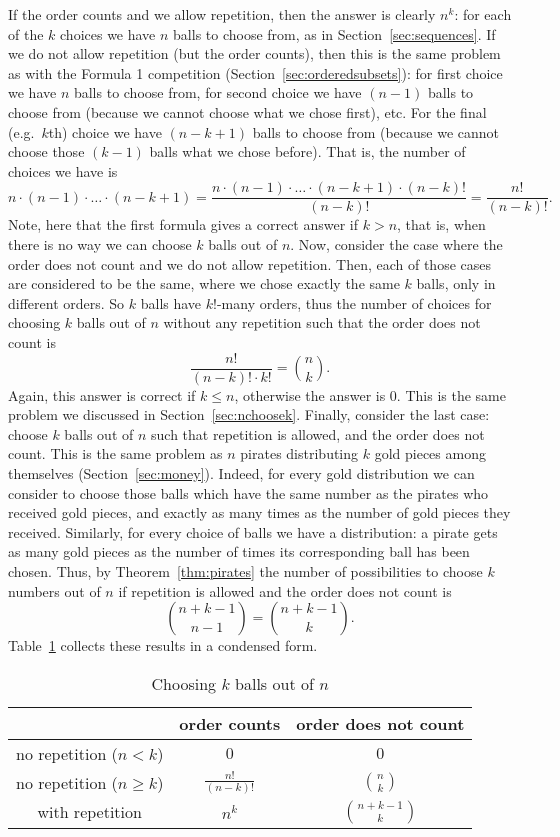 If the order counts and we allow repetition, 
then the answer is clearly $n^k$: 
for each of the $k$ choices we have $n$ balls to choose from, 
as in Section~\ref{sec:sequences}. 
If we do not allow repetition (but the order counts), 
then this is the same problem as with the Formula 1 competition (Section~\ref{sec:orderedsubsets}): 
for first choice we have $n$ balls to choose from, 
for second choice we have $(n-1)$ balls to choose from (because we cannot choose what we chose first), 
etc. 
For the final (e.g.\ $k$th) choice we have $(n-k+1)$ balls to choose from (because we cannot choose those $(k-1)$ balls what we chose before). 
That is, the number of choices we have is 
\[
n \cdot (n-1) \cdot \dots \cdot (n-k+1) = \frac{n \cdot (n-1) \cdot \dots \cdot (n-k+1) \cdot (n-k)!}{(n-k)!} = \frac{n!}{(n-k)!}. 
\]
Note, here that the first formula gives a correct answer if $k>n$, 
that is, when there is no way we can choose $k$ balls out of $n$. 
Now, consider the case where the order does not count and we do not allow repetition. 
Then, each of those cases are considered to be the same, 
where we chose exactly the same $k$ balls, only in different orders. 
So $k$ balls have $k!$-many orders, 
thus the number of choices for choosing $k$ balls out of $n$ without any repetition such that the order does not count is
\[
\frac{n!}{(n-k)! \cdot k!} = \binom{n}{k}. 
\]
Again, this answer is correct if $k\leq n$, otherwise the answer is 0. 
This is the same problem we discussed in Section~\ref{sec:nchoosek}. 
Finally, consider the last case: choose $k$ balls out of $n$ such that repetition is allowed, 
and the order does not count. 
This is the same problem as $n$ pirates distributing $k$ gold pieces among themselves (Section~\ref{sec:money}). 
Indeed, 
for every gold distribution we can consider to choose those balls which have the same number as the pirates who received gold pieces, 
and exactly as many times as the number of gold pieces they received. 
Similarly, 
for every choice of balls we have a distribution: 
a pirate gets as many gold pieces as the number of times its corresponding ball has been chosen. 
Thus, by Theorem~\ref{thm:pirates} the number of possibilities to choose $k$ numbers out of $n$ if repetition is allowed and the order does not count is
\[
\binom{n+k-1}{n-1} = \binom{n+k-1}{k}. 
\]
Table~\ref{tab:nchoosek} collects these results in a condensed form. %

\begin{table}[!htb]
\caption{Choosing $k$ balls out of $n$}\label{tab:nchoosek}
\begin{center}
\begin{tabular}{|c||c|c|}
\hline
& order counts & order does not count \\
\hline \hline
no repetition ($n< k$) & $0$ & $0$\\
\hline
no repetition ($n\geq k$) & $\frac{n!}{(n-k)!}$ & $\binom{n}{k}$\\
\hline
with repetition & $n^k$ & $\binom{n+k-1}{k}$ \\
\hline
\end{tabular}
\end{center}
\end{table}

